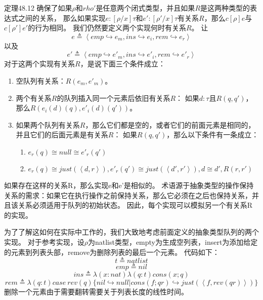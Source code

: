 定理48.12%
确保了如果$\rho$和$rho'$是任意两个闭式类型，并且如果$R$是这两种类型的表达式之间的关系，
那么如果实现$e:[\rho/x]\tau$和$e':[\rho'/x]\tau$有关系$R$，那么$c[\rho]e$与$c[\rho']e'$的行为相同。
我们仍然要定义两个实现何时有关系$R$。
让
$$e \triangleq \left \langle emp \hookrightarrow e_{m},ins \hookrightarrow e_{i},rem \hookrightarrow e_{r} \right \rangle$$
以及
$$e' \triangleq \left \langle emp \hookrightarrow e'_{m},ins \hookrightarrow e'_{i},rem \hookrightarrow e'_{r} \right \rangle$$
对于这两个实现有关系$R$，是说下面三个条件成立：
\begin{enumerate}
\item 空队列有关系：$R(e_{m},e'_{m})$。
\item 两个有关系$R$的队列插入同一个元素后依旧有关系$R$：
如果$d:\tau$且$R(q,q')$，那么$R(e_{i}(d)(q),e'_{i}(d)(q'))$。
\item 如果两个队列有关系$R$，那么它们都是空的，或者它们的前面元素是相同的，并且它们的后面元素是有关系$R$：
如果$R(q,q')$，那么以下条件有一条成立：
	\begin{enumerate}
	\item $e_{r}(q) \cong null \cong e'_{r}(q')$
	\item $e_{r}(q) \cong just(\left \langle d,r \right \rangle),e'_{r}(q') \cong just(\left \langle d',r' \right \rangle),d \cong d',R(r,r')$
	\end{enumerate}
\end{enumerate}
如果存在这样的关系R，那么实现e和e'是相似的。 术语源于抽象类型的操作保持关系的需求：如果它在执行操作之前保持关系，那么它必须在之后也保持关系，并且该关系必须适用于队列的初始状态。 因此，每个实现可以模拟另一个有关系R的实现。

为了了解这如何在实际中工作的，我们大致地考虑前面定义的抽象类型队列的两个实现。
对于参考实现，设$\rho$为natlist类型，empty为生成空列表，insert为添加给定的元素到列表头部，remove为删除列表的最后一个元素。
代码如下：
$$t \triangleq natlist$$
$$emp \triangleq nil$$
$$ins \triangleq \lambda(x:nat)\lambda(q:t)cons(x;q)$$
$$rem \triangleq \lambda(q:t)case\ rev(q)\{nil \hookrightarrow null|cons(f;qr) \hookrightarrow just(\left \langle f,rev(qr) \right \rangle)\}$$
删除一个元素由于需要翻转需要关于列表长度的线性时间。

